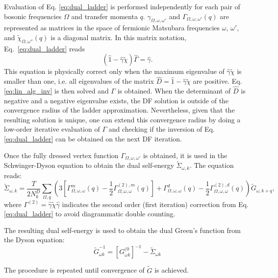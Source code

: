 \documentclass[3p,times,procedia]{elsarticle}
\begin{document}
Evaluation of Eq. \ref{eq:dual_ladder} is performed independently for each pair of bosonic frequencies $\Omega$ and transfer momenta $q$. 
$\gamma_{\Omega,\omega,\omega'}$ and $\Gamma_{\Omega,\omega,\omega'}(q)$ are represented as matrices in the space of fermionic Matsubara frequencies $\omega$, $\omega'$, and $\tilde\chi_{\Omega,\omega''}(q)$ is a diagonal matrix. 
In this matrix notation, Eq.~\ref{eq:dual_ladder} reads
\begin{equation}\label{eq:lin_alg_inv}
(\hat 1 - \hat \gamma \tilde \chi)\hat \Gamma  = \hat \gamma.
\end{equation} 
This equation is physically correct only when the maximum eigenvalue of $\hat \gamma \tilde \chi$ is smaller than one, i.e. all eigenvalues of the matrix $\hat D = \hat 1 - \hat \gamma \tilde \chi$ are positive. Eq. \ref{eq:lin_alg_inv} is then solved and $\Gamma$ is obtained. When the determinant of $\hat D$ is negative and a negative eigenvalue exists, the DF solution is outside of the convergence radius of the ladder approximation. Nevertheless, given that the resulting solution is unique, one can extend this convergence radius by doing a low-order iterative evaluation of $\Gamma$ and checking if the inversion of Eq. \ref{eq:dual_ladder} can be obtained on the next DF iteration. 
 
Once the fully dressed vertex function $\Gamma_{\Omega,\omega,\omega'}$ is obtained, it is used in the Schwinger-Dyson equation to obtain the dual self-energy $\tilde \Sigma_{\omega, k}$. 
The equation reads:
\begin{equation}\label{eq:sd}
\tilde \Sigma_{\omega, k} = \frac{T}{2 N_k^D}  \sum_{\Omega, q} \left( 3 \left[\Gamma^m_{\Omega,\omega,\omega}(q) - \frac{1}{2}\Gamma^{(2), m}_{\Omega,\omega,\omega}(q) \right] + \Gamma^d_{\Omega,\omega,\omega}(q) - \frac{1}{2}\Gamma^{(2), d}_{\Omega,\omega,\omega}(q)  \right) \tilde G_{\omega, k + q},
\end{equation}
where $\Gamma^{(2)} = \hat \gamma \tilde \chi \hat \gamma $ indicates the second order (first iteration) correction from Eq. \ref{eq:dual_ladder} to avoid diagrammatic double counting. 

The resulting dual self-energy is used to obtain the dual Green's function from the Dyson equation:
\begin{equation}\label{eq:dyson}
\tilde G^{-1}_{\omega k} = \left[G^{(0}_{\omega k}\right]^{-1} - \tilde \Sigma_{\omega k}
\end{equation}

The procedure is repeated until convergence of $\tilde G$ is achieved. 
\end{document}

